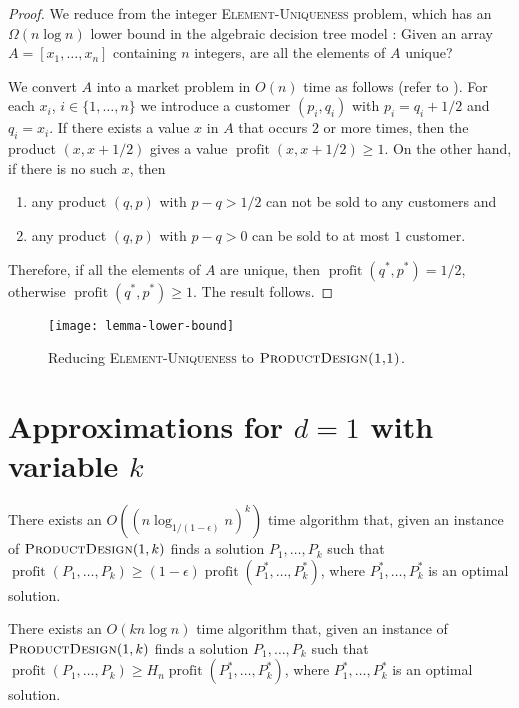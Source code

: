 \documentclass[lotsofwhite]{patmorin}
\newcommand{\val}{\operatorname{profit}}
\begin{document}
\begin{proof}
  We reduce from the integer \textsc{Element-Uniqueness} problem, which
  has an $\Omega(n\log n)$ lower bound in the algebraic decision tree
  model \cite{boYY,yXX}: Given an array $A=[x_1,\ldots,x_n]$ containing
  $n$ integers, are all the elements of $A$ unique?

  We convert $A$ into a market problem in $O(n)$ time as follows (refer
  to ).  For each $x_i$, $i\in\{1,\ldots,n\}$
  we introduce a customer $(p_i,q_i)$ with $p_i=q_i+1/2$ and $q_i=x_i$.
  If there exists a value $x$ in $A$ that occurs $2$ or more times, then
  the product $(x,x+1/2)$ gives a value $\val(x,x+1/2) \ge 1$.  On the
  other hand, if there is no such $x$, then \begin{enumerate} \item
  any product $(q,p)$ with $p-q>1/2$ can not be sold to any customers
  and \item any product $(q,p)$ with $p-q>0$ can be sold to at most $1$
  customer.  \end{enumerate} Therefore, if all the elements of $A$ are
  unique, then $\val(q^*,p^*) = 1/2$, otherwise $\val(q^*,p^*) \ge 1$.
  The result follows.
\end{proof}

\begin{figure}
  \begin{center}
    \texttt{[image: lemma-lower-bound]}
  \end{center}
  \caption{Reducing \textsc{Element-Uniqueness} to
           $\textsc{ProductDesign(1,1)}$.}
\end{figure}


\section{Approximations for $d=1$ with variable $k$}

\begin{thm}
There exists an $O((n\log_{1/(1-\epsilon)} n)^k)$ time algorithm that,
given an instance of $\textsc{ProductDesign}(1,k)$ finds a solution
$P_1,\ldots,P_k$ such that $\val(P_1,\ldots,P_k) \ge
(1-\epsilon)\val(P_1^*,\ldots,P_k^*)$, where $P_1^*,\ldots,P_k^*$ is
an optimal solution.
\end{thm}


\begin{thm}
There exists an $O(kn\log n)$ time algorithm that,
given an instance of $\textsc{ProductDesign}(1,k)$ finds a solution
$P_1,\ldots,P_k$ such that $\val(P_1,\ldots,P_k) \ge
H_n\val(P_1^*,\ldots,P_k^*)$, where $P_1^*,\ldots,P_k^*$ is
an optimal solution.
\end{thm}
\end{document}
